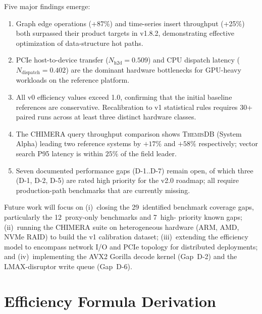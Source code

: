 \documentclass[conference]{IEEEtran}
\newcommand{\themis}{\textsc{ThemisDB}}
\begin{document}
Five major findings emerge:
\begin{enumerate}
  \item Graph edge operations (+87\%) and time-series insert
        throughput (+25\%) both surpassed their product targets in
        v1.8.2, demonstrating effective optimization of data-structure
        hot paths.
  \item PCIe host-to-device transfer ($N_{\text{h2d}} = 0.509$) and
        CPU dispatch latency ($N_{\text{dispatch}} = 0.402$) are the
        dominant hardware bottlenecks for GPU-heavy workloads on the
        reference platform.
  \item All v0 efficiency values exceed 1.0, confirming that the
        initial baseline references are conservative.
        Recalibration to v1 statistical rules requires 30+ paired
        runs across at least three distinct hardware classes.
  \item The CHIMERA query throughput comparison shows \themis{}
        (System Alpha) leading two reference systems by $+17\%$ and
        $+58\%$ respectively; vector search P95 latency is within
        $25\%$ of the field leader.
  \item Seven documented performance gaps (D-1..D-7) remain open,
        of which three (D-1, D-2, D-5) are rated high priority for
        the v2.0 roadmap; all require production-path benchmarks
        that are currently missing.
\end{enumerate}

Future work will focus on (i)~closing the 29~identified benchmark
coverage gaps, particularly the 12~proxy-only benchmarks and 7~high-
priority known gaps; (ii)~running the CHIMERA suite on heterogeneous
hardware (ARM, AMD, NVMe RAID) to build the v1 calibration dataset;
(iii)~extending the efficiency model to encompass network I/O and PCIe
topology for distributed deployments; and (iv)~implementing the
AVX2 Gorilla decode kernel (Gap~D-2) and the LMAX-disruptor write
queue (Gap~D-6).

\balance



\appendix

\section{Efficiency Formula Derivation}
\label{app:derivation}
\end{document}
